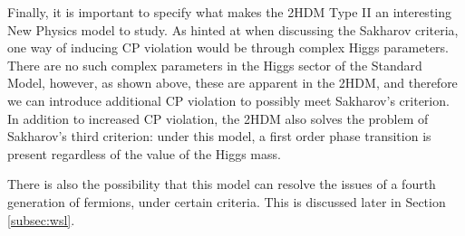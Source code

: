 \documentclass[a4paper,12pt]{article}
\begin{document}
Finally, it is important to specify what makes the 2HDM Type II an interesting New Physics model to study. 
As hinted at when discussing the Sakharov criteria, one way of inducing CP violation would be through complex Higgs parameters. 
There are no such complex parameters in the Higgs sector of the Standard Model, however, as shown above, these are apparent in the 2HDM, and therefore we can introduce additional CP violation to possibly meet Sakharov's criterion. 
In addition to increased CP violation, the 2HDM also solves the problem of Sakharov's third criterion: under this model, a first order phase transition is present regardless of the value of the Higgs mass. 

There is also the possibility that this model can resolve the issues of a fourth generation of fermions, under certain criteria. 
This is discussed later in Section \ref{subsec:wsl}.
\end{document}
